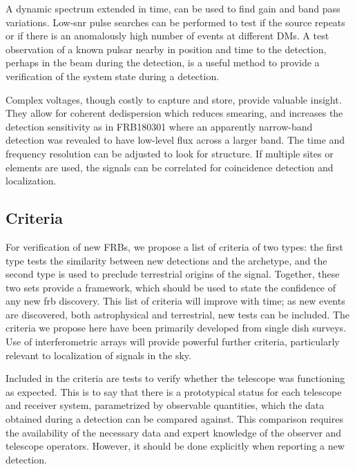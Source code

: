 \documentclass[a4paper,fleqn,usenatbib]{mnras}
\newcommand{\GSF}[1]{\noindent\textcolor{green}{GSF:#1}}
\newcommand{\cM}[1]{\textcolor{magenta}{ #1 --M}}
\newcommand{\dcp}[1]{\textcolor{rgb:-green!30!yellow,3;green!30!yellow,2;red,1}{ #1 --D}}
\begin{document}
A dynamic spectrum extended in time, can be used to find gain and band pass
variations. Low-\gls{snr} pulse searches can be performed to test if the source
repeats or if there is an anomalously high number of events at different DMs.  A
test observation of a known pulsar nearby in position and time to the detection,
perhaps in the beam during the detection, is a useful method to provide a
verification of the system state during a detection.

Complex voltages, though costly to capture and store, provide valuable insight.
They allow for coherent dedispersion which reduces smearing, and increases the
detection sensitivity as in FRB180301 \citep{atel11376} where an apparently
narrow-band detection was revealed to have low-level flux across a larger band.
The time and frequency resolution can be adjusted to look for structure. If
multiple sites or elements are used, the signals can be correlated for
coincidence detection and localization.

\subsection{Criteria}
\label{sec:criteria}


For verification of new FRBs, we propose a list of criteria of two types: the
first type tests the similarity between new detections and the archetype, and the
second type is used to preclude terrestrial origins of the signal. Together,
these two sets provide a framework, which should be used to state the confidence
of any new \gls{frb} discovery. This list of criteria will improve with time; as
new events are discovered, both astrophysical and terrestrial, new tests can be
included. The criteria we propose here have been primarily developed from single
dish surveys.  Use of interferometric arrays will provide powerful further
criteria, particularly relevant to localization of signals in the sky.

Included in the criteria are tests to verify whether the telescope was
functioning as expected. This is to say that there is a prototypical status for
each telescope and receiver system, parametrized by observable quantities, which
the data obtained during a detection can be compared against.  This comparison
requires the availability of the necessary data and expert knowledge of the
observer and telescope operators. However, it should be done explicitly when
reporting a new detection.
\end{document}
